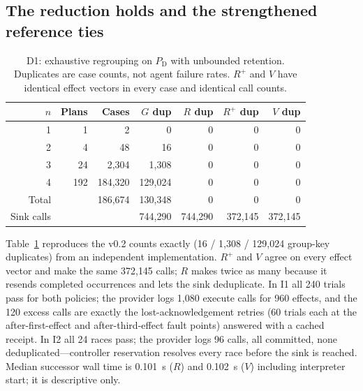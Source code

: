 \documentclass[conference,10pt]{IEEEtran}
\newcommand{\PD}{P_{\mathrm{D}}}
\begin{document}
\subsection{The reduction holds and the strengthened reference ties}
\begin{table}[t]
\centering\footnotesize
\caption{D1: exhaustive regrouping on $\PD$ with unbounded retention. Duplicates are case counts, not agent failure rates. $R^{+}$ and $V$ have identical effect vectors in every case and identical call counts.}
\label{tab:d1}
\begin{tabular}{@{}rrrrrrr@{}}
\toprule
$n$ & Plans & Cases & $G$ dup & $R$ dup & $R^{+}$ dup & $V$ dup\\
\midrule
1 & 1 & 2 & 0 & 0 & 0 & 0\\
2 & 4 & 48 & 16 & 0 & 0 & 0\\
3 & 24 & 2{,}304 & 1{,}308 & 0 & 0 & 0\\
4 & 192 & 184{,}320 & 129{,}024 & 0 & 0 & 0\\
\midrule
Total & & 186{,}674 & 130{,}348 & 0 & 0 & 0\\
Sink calls & & & 744{,}290 & 744{,}290 & 372{,}145 & 372{,}145\\
\bottomrule
\end{tabular}
\end{table}
Table~\ref{tab:d1} reproduces the v0.2 counts exactly (16 / 1{,}308 / 129{,}024 group-key duplicates) from an independent implementation. $R^{+}$ and $V$ agree on every effect vector and make the same 372{,}145 calls; $R$ makes twice as many because it resends completed occurrences and lets the sink deduplicate. In I1 all 240 trials pass for both policies; the provider logs 1{,}080 execute calls for 960 effects, and the 120 excess calls are exactly the lost-acknowledgement retries (60 trials each at the after-first-effect and after-third-effect fault points) answered with a cached receipt. In I2 all 24 races pass; the provider logs 96 calls, all committed, none deduplicated---controller reservation resolves every race before the sink is reached. Median successor wall time is 0.101~s ($R$) and 0.102~s ($V$) including interpreter start; it is descriptive only.
\end{document}

